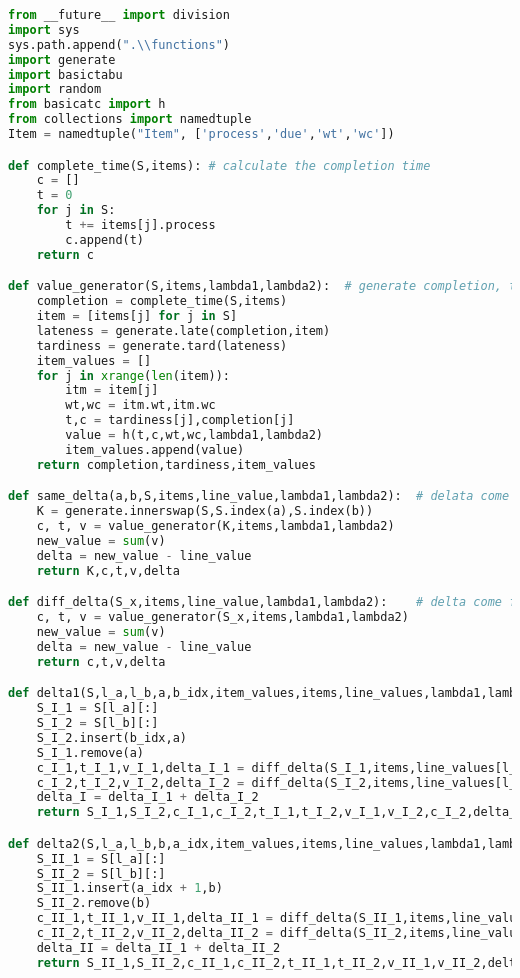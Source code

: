 \begin{lstlisting}[language = Python]
from __future__ import division
import sys
sys.path.append(".\\functions")
import generate
import basictabu
import random
from basicatc import h
from collections import namedtuple
Item = namedtuple("Item", ['process','due','wt','wc'])

def complete_time(S,items):	# calculate the completion time
	c = []
	t = 0
	for j in S:		
		t += items[j].process
		c.append(t)
	return c

def value_generator(S,items,lambda1,lambda2):  # generate completion, tardniess, and item contribution values
	completion = complete_time(S,items)
	item = [items[j] for j in S]
	lateness = generate.late(completion,item)
	tardiness = generate.tard(lateness)
	item_values = []
	for j in xrange(len(item)):
		itm = item[j]
		wt,wc = itm.wt,itm.wc
		t,c = tardiness[j],completion[j]
		value = h(t,c,wt,wc,lambda1,lambda2)
		item_values.append(value)
	return completion,tardiness,item_values

def same_delta(a,b,S,items,line_value,lambda1,lambda2):  # delata come from in-line swap
	K = generate.innerswap(S,S.index(a),S.index(b))
	c, t, v = value_generator(K,items,lambda1,lambda2)
	new_value = sum(v)
	delta = new_value - line_value
	return K,c,t,v,delta

def diff_delta(S_x,items,line_value,lambda1,lambda2):	 # delta come from between-line swap
	c, t, v = value_generator(S_x,items,lambda1,lambda2)
	new_value = sum(v)
	delta = new_value - line_value
	return c,t,v,delta

def delta1(S,l_a,l_b,a,b_idx,item_values,items,line_values,lambda1,lambda2):  # insert item type 1
	S_I_1 = S[l_a][:]
	S_I_2 = S[l_b][:]
	S_I_2.insert(b_idx,a)
	S_I_1.remove(a)
	c_I_1,t_I_1,v_I_1,delta_I_1 = diff_delta(S_I_1,items,line_values[l_a],lambda1,lambda2)
	c_I_2,t_I_2,v_I_2,delta_I_2 = diff_delta(S_I_2,items,line_values[l_b],lambda1,lambda2)
	delta_I = delta_I_1 + delta_I_2
	return S_I_1,S_I_2,c_I_1,c_I_2,t_I_1,t_I_2,v_I_1,v_I_2,c_I_2,delta_I

def delta2(S,l_a,l_b,b,a_idx,item_values,items,line_values,lambda1,lambda2): # insert item type 2
	S_II_1 = S[l_a][:]
	S_II_2 = S[l_b][:]
	S_II_1.insert(a_idx + 1,b)
	S_II_2.remove(b)
	c_II_1,t_II_1,v_II_1,delta_II_1 = diff_delta(S_II_1,items,line_values[l_a],lambda1,lambda2)
	c_II_2,t_II_2,v_II_2,delta_II_2 = diff_delta(S_II_2,items,line_values[l_b],lambda1,lambda2)
	delta_II = delta_II_1 + delta_II_2
	return S_II_1,S_II_2,c_II_1,c_II_2,t_II_1,t_II_2,v_II_1,v_II_2,delta_II
	

\end{lstlisting}
